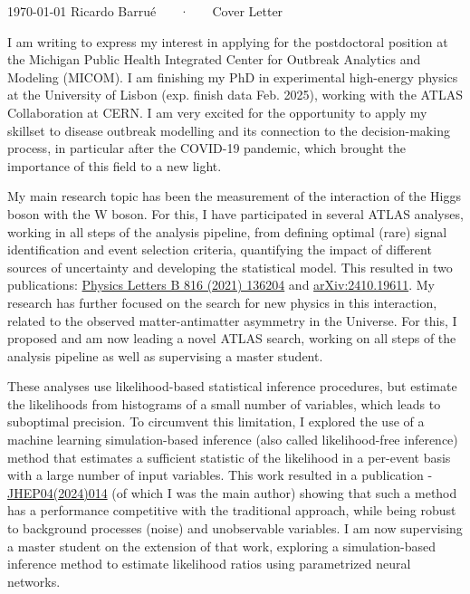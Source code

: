 \documentclass[11pt, a4paper]{awesome-cv}
\begin{document}
\makecvheader[R]

\makecvfooter
  {\today}
  {Ricardo Barrué ~~~·~~~ Cover Letter}
  {}

\makelettertitle

\begin{cvletter}

I am writing to express my interest in applying for the postdoctoral position at the Michigan Public Health Integrated Center for Outbreak Analytics and Modeling (MICOM). I am finishing my PhD in experimental high-energy physics at the University of Lisbon (exp. finish data Feb. 2025), working with the ATLAS Collaboration at CERN. I am very excited for the opportunity to apply my skillset to disease outbreak modelling and its connection to the decision-making process, in particular after the COVID-19 pandemic, which brought the importance of this field to a new light.

My main research topic has been the measurement of the interaction of the Higgs boson with the W boson. For this, I have participated in several ATLAS analyses, working in all steps of the analysis pipeline, from defining optimal (rare) signal identification and event selection criteria, quantifying the impact of different sources of uncertainty and developing the statistical model. This resulted in two publications: \href{https://doi.org/10.1016/j.physletb.2021.136204}{Physics Letters B 816 (2021) 136204} and \href{https://arxiv.org/abs/2410.19611}{arXiv:2410.19611}. My research has further focused on the search for new physics in this interaction, related to the observed matter-antimatter asymmetry in the Universe. For this, I proposed and am now leading a novel ATLAS search, working on all steps of the analysis pipeline as well as supervising a master student.

These analyses use likelihood-based statistical inference procedures, but estimate the likelihoods from histograms of a small number of variables, which leads to suboptimal precision. To circumvent this limitation, I explored the use of a machine learning simulation-based inference (also called likelihood-free inference) method that estimates a sufficient statistic of the likelihood in a per-event basis with a large number of input variables. This work resulted in a publication - \href{http://dx.doi.org/10.1007/JHEP04(2024)014}{JHEP04(2024)014} (of which I was the main author) showing that such a method has a performance competitive with the traditional approach, while being robust to background processes (noise) and unobservable variables. I am now supervising a master student on the extension of that work, exploring a simulation-based inference method to estimate likelihood ratios using parametrized neural networks.


\end{cvletter}
\end{document}

